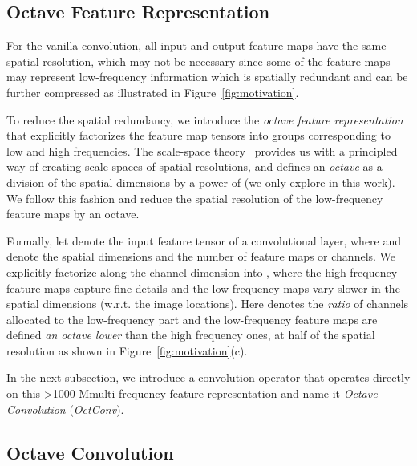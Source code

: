 \documentclass[10pt,twocolumn,letterpaper]{article}
\newcommand\hmm[1]{\ifnum\ifhmode\spacefactor\else2000\fi>1000 \uppercase{#1}\else#1\fi}
\newcommand{\hiConv}[0]{OctConv\xspace}
\newcommand{\hiConvName}[0]{Octave Convolution\xspace}
\newcommand{\hierarchicalfeaturerepresentation}[0]{\hmm{m}ulti-frequency feature representation\xspace}
\begin{document}
\subsection{Octave Feature Representation}
\label{sec:feature_representation}

For the vanilla convolution, all input and output feature maps have the same spatial resolution, which may not be necessary since some of the feature maps may represent low-frequency information which is spatially redundant and can be further compressed as illustrated in Figure~\ref{fig:motivation}. 

To reduce the spatial redundancy, we introduce the \emph{octave feature representation} that explicitly factorizes the feature map tensors into groups corresponding to low and high frequencies. The scale-space theory~\cite{lindeberg2013scale} provides us with a principled way of creating scale-spaces of spatial resolutions, and defines an \emph{octave} as a division of the spatial dimensions by a power of  (we only explore  in this work). We follow this fashion and reduce the spatial resolution of the low-frequency feature maps by an octave.

Formally, let  denote the input feature tensor of a convolutional layer, where  and  denote the spatial dimensions and  the number of feature maps or channels. We explicitly factorize  along the channel dimension into , where the high-frequency feature maps  capture fine details and the low-frequency maps   vary slower in the spatial dimensions (w.r.t. the image locations). Here  denotes the \emph{ratio} of channels allocated to the low-frequency part and the low-frequency feature maps are defined \textit{an octave lower} than the high frequency ones, \ie at half of the spatial resolution as shown in Figure~\ref{fig:motivation}(c).

In the next subsection, we introduce a convolution operator that operates directly on this \hierarchicalfeaturerepresentation and name it \emph{\hiConvName} (\emph{\hiConv}).



\subsection{\hiConvName}
\label{sec:octaconv}
\end{document}
